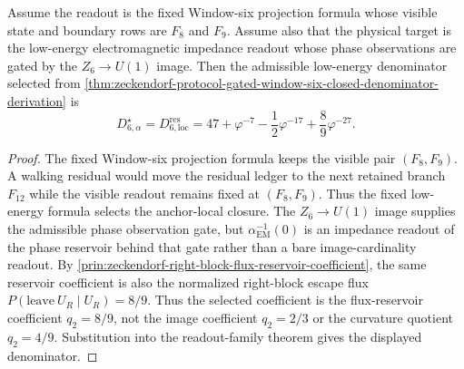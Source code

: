 \begin{theorem}
\label{thm:zeckendorf-fixed-electromagnetic-readout-selection}
Assume the readout is the fixed Window-six projection formula whose visible
state and boundary rows are \(F_8\) and \(F_9\). Assume also that the
physical target is the low-energy electromagnetic impedance readout whose
phase observations are gated by the \(Z_6\to U(1)\) image. Then the
admissible low-energy denominator selected from
\autoref{thm:zeckendorf-protocol-gated-window-six-closed-denominator-derivation}
is
$$
  D_{6,\alpha}^{\star}
  =
  D_{6,\mathrm{loc}}^{\mathrm{res}}
  =
  47+\varphi^{-7}-\frac12\varphi^{-17}+\frac89\varphi^{-27}.
$$
\end{theorem}
\begin{proof}
The fixed Window-six projection formula keeps the visible pair
\((F_8,F_9)\). A walking residual would move the residual ledger to the
next retained branch \(F_{12}\) while the visible readout remains fixed at
\((F_8,F_9)\). Thus the fixed low-energy formula selects the
anchor-local closure. The \(Z_6\to U(1)\) image supplies the admissible
phase observation gate, but \(\alpha_{\mathrm{EM}}^{-1}(0)\) is an
impedance readout of the phase reservoir behind that gate rather than a
bare image-cardinality readout. By
\autoref{prin:zeckendorf-right-block-flux-reservoir-coefficient}, the
same reservoir coefficient is also the normalized right-block escape
flux \(P(\mathrm{leave}\ U_R\mid U_R)=8/9\). Thus the selected
coefficient is the flux-reservoir coefficient \(q_2=8/9\), not the image
coefficient \(q_2=2/3\) or the curvature quotient \(q_2=4/9\).
Substitution into the
readout-family theorem gives the displayed denominator.
\end{proof}

